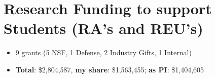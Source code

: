 \documentclass[11pt]{article}
\begin{document}
\section{Research Funding to support Students (RA's and REU's)}
\begin{itemize}[label={},before=\small]
    \item 9 grants (5 NSF, 1 Defense, 2 Industry Gifts, 1 Internal)
    
    \item \textbf{Total}: \$2,804,587, \textbf{my share}: \$1,563,455;  \textbf{as PI}: \$1,404,605
\end{itemize}


\end{document}
